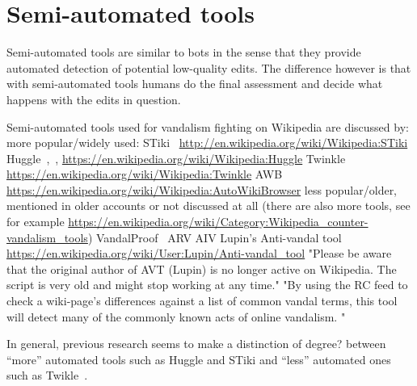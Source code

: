 
\section{Semi-automated tools}

Semi-automated tools are similar to bots in the sense that they provide automated detection of potential low-quality edits.
The difference however is that with semi-automated tools humans do the final assessment and decide what happens with the edits in question.

Semi-automated tools used for vandalism fighting on Wikipedia are discussed by:
more popular/widely used:
STiki~\cite{WestKanLee2010}
\url{http://en.wikipedia.org/wiki/Wikipedia:STiki}
Huggle~\cite{GeiHal2013},~\cite{HalRied2012},\cite{GeiRib2010}
\url{https://en.wikipedia.org/wiki/Wikipedia:Huggle}
Twinkle
\url{https://en.wikipedia.org/wiki/Wikipedia:Twinkle}
AWB
\url{https://en.wikipedia.org/wiki/Wikipedia:AutoWikiBrowser}
less popular/older, mentioned in older accounts or not discussed at all (there are also more tools, see for example \url{https://en.wikipedia.org/wiki/Category:Wikipedia_counter-vandalism_tools})
VandalProof~\cite{HalRied2012}
ARV
AIV
Lupin's Anti-vandal tool~\cite{GeiRib2010}
\url{https://en.wikipedia.org/wiki/User:Lupin/Anti-vandal_tool}
"Please be aware that the original author of AVT (Lupin) is no longer active on Wikipedia. The script is very old and might stop working at any time."
"By using the RC feed to check a wiki-page's differences against a list of common vandal terms, this tool will detect many of the commonly known acts of online vandalism. "

In general, previous research seems to make a distinction of degree? between ``more'' automated tools such as Huggle and STiki and ``less'' automated ones such as Twikle~\cite{GeiHal2013}.

